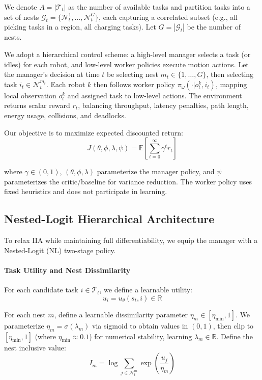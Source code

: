 \documentclass[12pt,a4paper]{article}
\begin{document}
We denote $A = |\mathcal{T}_t|$ as the number of available tasks and partition tasks into a set of nests $\mathcal{G}_t = \{\mathcal{N}^1_t, \dots, \mathcal{N}^{G}_t\}$, each capturing a correlated subset (e.g., all picking tasks in a region, all charging tasks). Let $G = |\mathcal{G}_t|$ be the number of nests.

We adopt a hierarchical control scheme: a high-level manager selects a task (or idles) for each robot, and low-level worker policies execute motion actions. Let the manager's decision at time $t$ be selecting nest $m_t \in \{1, \dots, G\}$, then selecting task $i_t \in \mathcal{N}^{m_t}_t$. Each robot $k$ then follows worker policy $\pi_\omega(\cdot | o^k_t, i_t)$, mapping local observation $o^k_t$ and assigned task to low-level actions. The environment returns scalar reward $r_t$, balancing throughput, latency penalties, path length, energy usage, collisions, and deadlocks.

Our objective is to maximize expected discounted return:
\[J(\theta, \phi, \lambda, \psi) = \mathbb{E}\left[\sum_{t=0}^{\infty} \gamma^t r_t\right]\]

where $\gamma \in (0,1)$, $(\theta, \phi, \lambda)$ parameterize the manager policy, and $\psi$ parameterizes the critic/baseline for variance reduction. The worker policy uses fixed heuristics and does not participate in learning.

\subsection{Nested-Logit Hierarchical Architecture}

To relax IIA while maintaining full differentiability, we equip the manager with a Nested-Logit (NL) two-stage policy.

\paragraph{Task Utility and Nest Dissimilarity}

For each candidate task $i \in \mathcal{T}_t$, we define a learnable utility:
\[u_i = u_\theta(s_t, i) \in \mathbb{R}\]

For each nest $m$, define a learnable dissimilarity parameter $\eta_m \in [\eta_{\min}, 1]$. We parameterize $\eta_m = \sigma(\lambda_m)$ via sigmoid to obtain values in $(0,1)$, then clip to $[\eta_{\min}, 1]$ (where $\eta_{\min} \approx 0.1$) for numerical stability, learning $\lambda_m \in \mathbb{R}$. Define the nest inclusive value:
\[I_m = \log \sum_{j \in \mathcal{N}^m_t} \exp\left(\frac{u_j}{\eta_m}\right)\]
\end{document}
